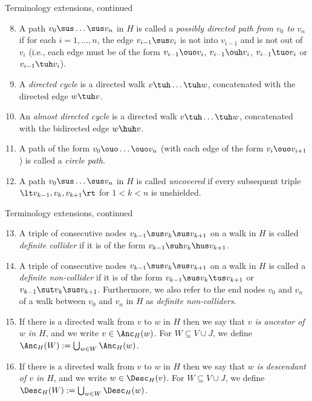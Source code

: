 \begin{frame}[t]{Terminology extensions, continued}
  \begin{Def}
  \begin{enumerate}
    \setcounter{enumi}{7}
    \item A path $v_0 \sus \dots \sus v_n$ in $H$ is called a \emph{possibly directed path from $v_0$ to $v_n$} if for each $i=1,\dots,n$, the edge $v_{i-1} \sus v_i$ is not into $v_{i-1}$ and is not out of $v_i$ (i.e., each edge must be of the form $v_{i-1} \ouo v_i$, $v_{i-1} \ouh v_i$, $v_{i-1} \tuo v_i$ or $v_{i-1} \tuh v_i$).
    \item A \emph{directed cycle} is a directed walk $v \tuh \dots \tuh w$, concatenated with
      the directed edge $w \tuh v$.
    \item An \emph{almost directed cycle} is a directed walk $v \tuh \dots \tuh w$, concatenated
      with the bidirected edge $w \huh v$.
    \item A path of the form $v_0 \ouo \dots \ouo v_n$ (with each edge of the form $v_i \ouo v_{i+1}$) is called a \emph{circle path}.
    \item A path $v_0 \sus \dots \sus v_n$ in $H$ is called \emph{uncovered} if every subsequent triple $\lt v_{k-1}, v_k, v_{k+1} \rt$ for $1 < k < n$ is unshielded.
  \end{enumerate}
  \end{Def}
\end{frame}

\begin{frame}[t]{Terminology extensions, continued}
  \begin{Def}
  \begin{enumerate}
    \setcounter{enumi}{12}
    \item A triple of consecutive nodes $v_{k-1} \sus v_k \sus v_{k+1}$ on a walk in $H$ is called \emph{definite collider}
      if it is of the form $v_{k-1} \suh v_k \hus v_{k+1}$.
    \item A triple of consecutive nodes $v_{k-1} \sus v_k \sus v_{k+1}$ on a walk in $H$ is called a \emph{definite non-collider}
      if it is of the form $v_{k-1} \sus v_k \tus v_{k+1}$ or $v_{k-1} \sut v_k \sus v_{k+1}$.
      Furthermore, we also refer to the end nodes $v_0$ and $v_n$ of a walk between $v_0$ and $v_n$ in $H$ as \emph{definite non-colliders}.
    \item If there is a directed walk from $v$ to $w$ in $H$ then we say that \emph{$v$ is ancestor of $w$ in $H$}, 
      and we write $v \in \Anc_H(w)$. For $W \subseteq V \cup J$, we define $\Anc_H(W) := \bigcup_{w\in W} \Anc_H(w)$.
    \item If there is a directed walk from $v$ to $w$ in $H$ then we say that \emph{$w$ is descendant of $v$ in $H$}, 
      and we write $w \in \Desc_H(v)$. For $W \subseteq V \cup J$, we define $\Desc_H(W) := \bigcup_{w\in W} \Desc_H(w)$.
  \end{enumerate}
  \end{Def}
\end{frame}

